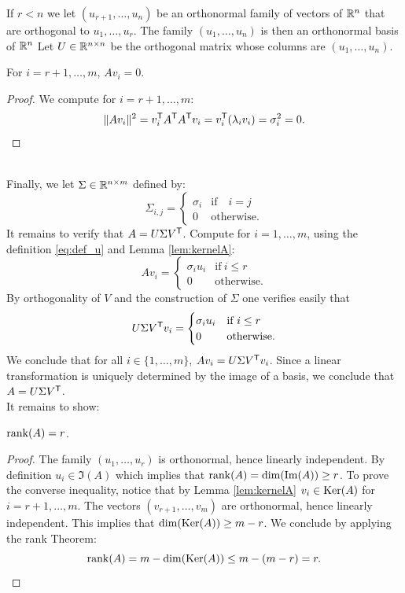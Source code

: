 \documentclass[11pt,nocut]{article}
\begin{document}
If $r < n$ we let $(u_{r+1}, \dots, u_n)$ be an orthonormal family of vectors of $\mathbb{R}^n$ that are orthogonal to $u_1, \dots, u_r$. The family $(u_1, \dots, u_n)$ is then an orthonormal basis of $\mathbb{R}^n$
Let $U \in \mathbb{R}^{n \times n}$ be the orthogonal matrix whose columns are $(u_1, \dots, u_n)$.

\begin{lemma}\label{lem:kernelA}
	For $i = r+1, \dots, m$, $A v_i = 0$.
\end{lemma}
\begin{proof}
	We compute for $i = r+1, \dots, m$:
	$$
	\|Av_i \|^2 = v_i^{{\sf T}} A^{{\sf T}} A^{{\sf T}} v_i = v_i^{{\sf T}}(\lambda_i v_i) = \sigma_i^2 = 0.
	$$
\end{proof}
\\

Finally, we let $\Sigma \in \mathbb{R}^{n \times m}$ defined by:
$$
\Sigma_{i,j} =
\begin{cases}
	\sigma_i & \text{if} \quad i=j \\
	0 & \text{otherwise}.
\end{cases}
$$
It remains to verify that $A = U \Sigma V^{{\sf T}}$.
Compute for $i=1, \dots, m$, using the definition \eqref{eq:def_u} and Lemma \ref{lem:kernelA}:
$$
A v_i = 
\begin{cases}
	\sigma_i u_i & \text{if} \ i \leq r \\
	0 & \text{otherwise}.
\end{cases}
$$
By orthogonality of $V$ and the construction of $\Sigma$ one verifies easily that
$$
U \Sigma V^{{\sf T}} v_i = 
\begin{cases}
	\sigma_i u_i & \text{if} \ i \leq r \\
	0 & \text{otherwise}.
\end{cases}
$$
We conclude that for all $i \in \{1, \dots, m\}$, $A v_i = U \Sigma V^{{\sf T}} v_i$. Since a linear transformation is uniquely determined by the image of a basis, we conclude that $A = U \Sigma V^{{\sf T}}$.
\\

It remains to show:
\begin{lemma}
	${{\rm rank}}(A) = r$.
\end{lemma}
\begin{proof}
	The family $(u_1, \dots, u_r)$ is orthonormal, hence linearly independent. By definition $u_i \in \Im(A)$ which implies that ${{\rm rank}}(A) = {{\rm dim}}({{\rm Im}}(A)) \geq r$.
	To prove the converse inequality, notice that by Lemma \ref{lem:kernelA} $v_i \in {{\rm Ker}}(A)$ for $i=r+1, \dots, m$.
	The vectors $(v_{r+1}, \dots, v_m)$ are orthonormal, hence linearly independent. This implies that ${{\rm dim}}({{\rm Ker}}(A)) \geq m-r$. We conclude by applying the rank Theorem:
	$$
	{{\rm rank}}(A) = m - {{\rm dim}}({{\rm Ker}}(A)) \leq m - (m-r) = r.
	$$
\end{proof}
\\

\vspace{1cm}
\centerline{}

%
%
\end{document}
